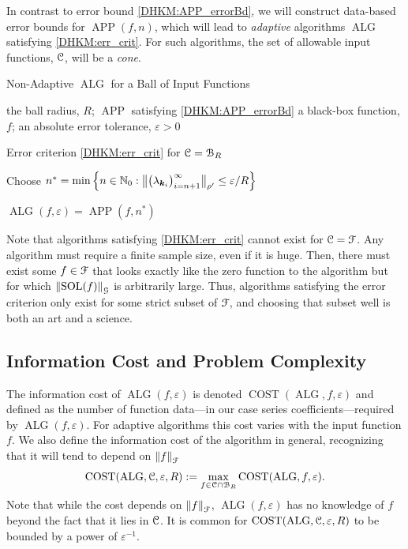 \documentclass[USenglish]{article}
\theoremstyle{dgthm}
\theoremstyle{dgthm}
\theoremstyle{dgthm}
\theoremstyle{dgthm}
\theoremstyle{dgdef}
\DeclareMathOperator{\SOL}{SOL}
\DeclareMathOperator{\APP}{APP}
\DeclareMathOperator{\ALG}{ALG}
\DeclareMathOperator{\COST}{COST}
\newcommand{\norm}[2][{}]{\ensuremath{\left \lVert #2 \right \rVert}_{#1}}
\newcommand{\bignorm}[2][{}]{\ensuremath{\bigl \lVert #2 \bigr \rVert}_{#1}}
\begin{document}
In contrast to error bound \eqref{DHKM:APP_errorBd}, we will construct data-based error bounds for $\APP(f,n)$, which will lead to \emph{adaptive} algorithms $\ALG$ satisfying \eqref{DHKM:err_crit}.  For such algorithms, the set of allowable input functions, ${\mathcal{C}}$, will be a \emph{cone}.

\begin{algorithm}
\caption{Non-Adaptive $\ALG$ for a Ball of Input Functions \label{DHKM:BallAlg}}
	\begin{algorithmic}
	\PARAM the ball radius, $R$; $\APP$ satisfying \eqref{DHKM:APP_errorBd}
	\INPUT a black-box function, $f$; an absolute error tolerance, $\varepsilon>0$

    \Ensure Error criterion \eqref{DHKM:err_crit} for ${\mathcal{C}} = {\mathcal{B}}_{R}$

    \State Choose $n^* =  \min \left \{n \in \N_0 : \bignorm[\rho']{\bigl(  \lambda_{\bsk_i}  \bigr)_{i = n+1}^{\infty}} \le \varepsilon /R \right \}$

    \RETURN $\ALG(f,\varepsilon) = \APP(f,n^*)$
\end{algorithmic}
\end{algorithm}

Note that algorithms satisfying \eqref{DHKM:err_crit} cannot exist for ${\mathcal{C}} = {\mathcal{F}}$. Any algorithm must require a finite sample size, even if it is huge.  Then, there must exist some $f \in {\mathcal{F}}$ that looks exactly like the zero function to the algorithm but for which $\norm[\calG]{\SOL(f)}$ is arbitrarily large.  Thus, algorithms satisfying the error criterion only exist for some strict subset of ${\mathcal{F}}$, and choosing that subset well is both an art and a science.


\subsection{Information Cost and Problem Complexity}

The information cost of $\ALG(f,\varepsilon)$ is denoted $\COST(\ALG,f,\varepsilon)$ and defined as the number of function data---in our case series coefficients---required by $\ALG(f,\varepsilon)$.  For adaptive algorithms this cost varies with the input function $f$.  We also define the information cost of the algorithm in general, recognizing that it will tend to depend on $\norm[\calF]{f}$
\begin{equation*}
    \COST(\ALG, \calC, \varepsilon,R) : = \max_{f \in \calC \cap \calB_{R}} \COST(\ALG,f,\varepsilon).
\end{equation*}
Note that while the cost depends on $\norm[\calF]{f}$, $\ALG(f,\varepsilon)$ has no knowledge of $f$ beyond the fact that it lies in ${\mathcal{C}}$.  It is common for $\COST(\ALG, \calC, \varepsilon,R)$ to be bounded by a power of $\varepsilon^{-1}$.
\end{document}
